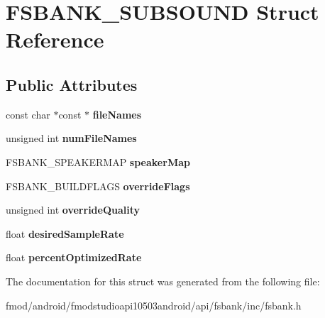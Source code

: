 \hypertarget{struct_f_s_b_a_n_k___s_u_b_s_o_u_n_d}{\section{F\+S\+B\+A\+N\+K\+\_\+\+S\+U\+B\+S\+O\+U\+N\+D Struct Reference}
\label{struct_f_s_b_a_n_k___s_u_b_s_o_u_n_d}
}
\subsection*{Public Attributes}
\begin{DoxyCompactItemize}
\item 
\hypertarget{struct_f_s_b_a_n_k___s_u_b_s_o_u_n_d_afd7f0cb5c11ee99193af1a401855085d}{const char $\ast$const $\ast$ {\bfseries file\+Names}}\label{struct_f_s_b_a_n_k___s_u_b_s_o_u_n_d_afd7f0cb5c11ee99193af1a401855085d}

\item 
\hypertarget{struct_f_s_b_a_n_k___s_u_b_s_o_u_n_d_afc2aae57bfddc82028772050fef93723}{unsigned int {\bfseries num\+File\+Names}}\label{struct_f_s_b_a_n_k___s_u_b_s_o_u_n_d_afc2aae57bfddc82028772050fef93723}

\item 
\hypertarget{struct_f_s_b_a_n_k___s_u_b_s_o_u_n_d_a2a8ec38f26eba98aba4e6abf23fe659d}{F\+S\+B\+A\+N\+K\+\_\+\+S\+P\+E\+A\+K\+E\+R\+M\+A\+P {\bfseries speaker\+Map}}\label{struct_f_s_b_a_n_k___s_u_b_s_o_u_n_d_a2a8ec38f26eba98aba4e6abf23fe659d}

\item 
\hypertarget{struct_f_s_b_a_n_k___s_u_b_s_o_u_n_d_a16c91622454bf06783c78d97cd601a54}{F\+S\+B\+A\+N\+K\+\_\+\+B\+U\+I\+L\+D\+F\+L\+A\+G\+S {\bfseries override\+Flags}}\label{struct_f_s_b_a_n_k___s_u_b_s_o_u_n_d_a16c91622454bf06783c78d97cd601a54}

\item 
\hypertarget{struct_f_s_b_a_n_k___s_u_b_s_o_u_n_d_afa4b6746e57b8a264c06ebdb0d8479a2}{unsigned int {\bfseries override\+Quality}}\label{struct_f_s_b_a_n_k___s_u_b_s_o_u_n_d_afa4b6746e57b8a264c06ebdb0d8479a2}

\item 
\hypertarget{struct_f_s_b_a_n_k___s_u_b_s_o_u_n_d_ad646cc2dc12b18d3272f07ed780d7ba8}{float {\bfseries desired\+Sample\+Rate}}\label{struct_f_s_b_a_n_k___s_u_b_s_o_u_n_d_ad646cc2dc12b18d3272f07ed780d7ba8}

\item 
\hypertarget{struct_f_s_b_a_n_k___s_u_b_s_o_u_n_d_ab4fe9bdcffde10ddd4b63bc4640360a2}{float {\bfseries percent\+Optimized\+Rate}}\label{struct_f_s_b_a_n_k___s_u_b_s_o_u_n_d_ab4fe9bdcffde10ddd4b63bc4640360a2}

\end{DoxyCompactItemize}


The documentation for this struct was generated from the following file\+:\begin{DoxyCompactItemize}
\item 
fmod/android/fmodstudioapi10503android/api/fsbank/inc/fsbank.\+h\end{DoxyCompactItemize}
